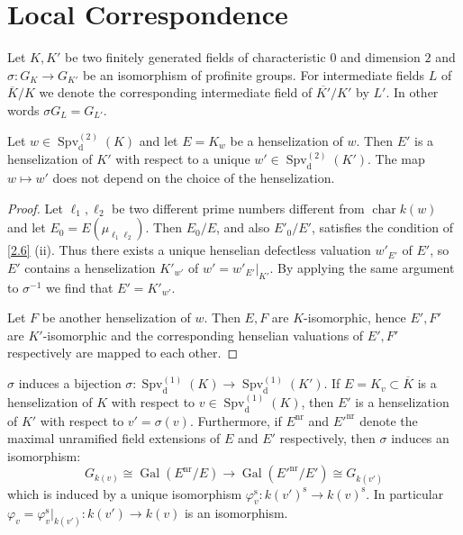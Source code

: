 \section{Local Correspondence}

Let $K,K'$ be two finitely generated fields of characteristic $0$ and dimension $2$ and $\sigma:G_K\to G_{K'}$ be an isomorphism of profinite groups. For intermediate fields $L$ of $\overline{K}/K$ we denote the corresponding intermediate field of $\overline{K'}/K'$ by $L'$. In other words $\sigma G_L=G_{L'}$.

\begin{lemma}\label{3.1}
Let $w\in\operatorname{Spv}_\text{d}^{(2)}(K)$ and let $E=K_w$ be a henselization of $w$. Then $E'$ is a henselization of $K'$ with respect to a unique $w'\in\operatorname{Spv}_\text{d}^{(2)}(K')$. The map $w\mapsto w'$ does not depend on the choice of the henselization.
\end{lemma}

\begin{proof}
Let $\ell_1,\ell_2$ be two different prime numbers different from $\operatorname{char} k(w)$ and let $E_0 = E(\mu_{\ell_1\ell_2})$. Then $E_0/E$, and also $E'_0/E'$, satisfies the condition of \ref{2.6} (ii). Thus there exists a unique henselian defectless valuation $w'_{E'}$ of $E'$, so $E'$ contains a henselization $K'_{w'}$ of $w' = w'_{E'}|_{K'}$. By applying the same argument to $\sigma^{-1}$ we find that $E' = K'_{w'}$.

Let $F$ be another henselization of $w$. Then $E, F$ are $K$-isomorphic, hence $E',F'$ are $K'$-isomorphic and the corresponding henselian valuations of $E', F'$ respectively are mapped to each other.
\end{proof}

\begin{lemma}\label{3.2}
$\sigma$ induces a bijection $\sigma:\operatorname{Spv}_\text{d}^{(1)}(K) \to\operatorname{Spv}_\text{d}^{(1)}(K')$. If $E=K_v\subset\overline{K}$ is a henselization of $K$ with respect to $v\in\operatorname{Spv}_\text{d}^{(1)}(K)$, then $E'$ is a henselization of $K'$ with respect to $v'=\sigma(v)$. Furthermore, if $E^{\text{nr}}$ and $E'^{\text{nr}}$ denote the maximal unramified field extensions of $E$ and $E'$ respectively, then $\sigma$ induces an isomorphism:
\[ G_{k(v)}\cong\operatorname{Gal}(E^\text{nr}/E) \to\operatorname{Gal}(E'^{\text{nr}}/E')\cong G_{k(v')} \]
which is induced by a unique isomorphism $\varphi_v^\text{s}:k(v')^\text{s}\to k(v)^\text{s}$. In particular $\varphi_v=\varphi_v^\text{s}|_{k(v')}:k(v')\to k(v)$ is an isomorphism.
\end{lemma}

